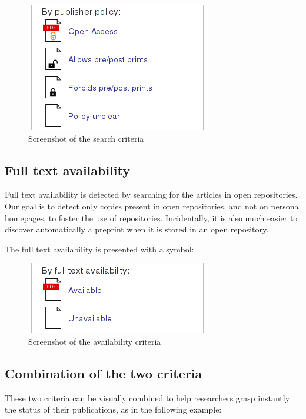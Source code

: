 \documentclass[a4paper]{article}
\begin{document}
\begin{figure}[htbp]
\centering
\includegraphics[scale=0.5]{img/policy.png}
\caption{Screenshot of the search criteria}
\end{figure}

\subsection{Full text availability}

Full text availability is detected by searching for the articles in open
repositories. Our goal is to detect only copies present in open
repositories, and not on personal homepages, to foster the use of
repositories. Incidentally, it is also much easier to discover
automatically a preprint when it is stored in an open repository.

The full text availability is presented with a symbol:

\begin{figure}[htbp]
\centering
\includegraphics[scale=0.5]{img/availability.png}
\caption{Screenshot of the availability criteria}
\end{figure}

\subsection{Combination of the two criteria}

These two criteria can be visually combined to help researchers grasp
instantly the status of their publications, as in the following example:
\end{document}
